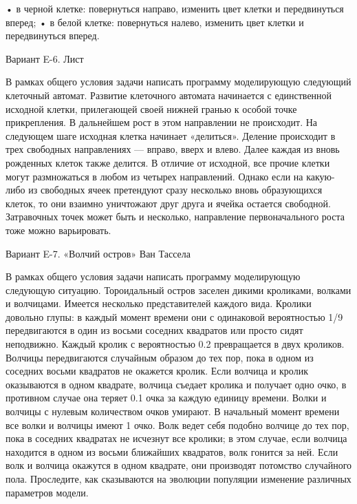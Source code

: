• в черной клетке: повернуться направо, изменить цвет клетки и передвинуться
  вперед;
• в белой клетке: повернуться налево, изменить цвет клетки и передвинуться
  вперед.


Вариант E-6. Лист

В рамках общего условия задачи написать программу моделирующую следующий
клеточный автомат. Развитие клеточного автомата начинается с единственной
исходной клетки, прилегающей своей нижней гранью к особой точке прикрепления.
В дальнейшем рост в этом направлении не происходит. На следующем шаге исходная
клетка начинает «делиться». Деление происходит в трех свободных направлениях —
вправо, вверх и влево. Далее каждая из вновь рожденных клеток также делится. В
отличие от исходной, все прочие клетки могут размножаться в любом из четырех
направлений. Однако если на какую-либо из свободных ячеек претендуют сразу
несколько вновь образующихся клеток, то они взаимно уничтожают друг друга и
ячейка остается свободной. Затравочных точек может быть и несколько,
направление первоначального роста тоже можно варьировать.


Вариант E-7. «Волчий остров» Ван Тассела

В рамках общего условия задачи написать программу моделирующую следующую
ситуацию. Тороидальный остров заселен дикими кроликами, волками и волчицами.
Имеется несколько представителей каждого вида. Кролики довольно глупы: в
каждый момент времени они с одинаковой вероятностью 1/9 передвигаются в один
из восьми соседних квадратов или просто сидят неподвижно. Каждый кролик с
вероятностью 0.2 превращается в двух кроликов. Волчицы передвигаются случайным
образом до тех пор, пока в одном из соседних восьми квадратов не окажется
кролик. Если волчица и кролик оказываются в одном квадрате, волчица съедает
кролика и получает одно очко, в противном случае она теряет 0.1 очка за каждую
единицу времени. Волки и волчицы с нулевым количеством очков умирают. В
начальный момент времени все волки и волчицы имеют 1 очко. Волк ведет себя
подобно волчице до тех пор, пока в соседних квадратах не исчезнут все кролики;
в этом случае, если волчица находится в одном из восьми ближайших квадратов,
волк гонится за ней. Если волк и волчица окажутся в одном квадрате, они
производят потомство случайного пола. Проследите, как сказываются на эволюции
популяции изменение различных параметров модели.

